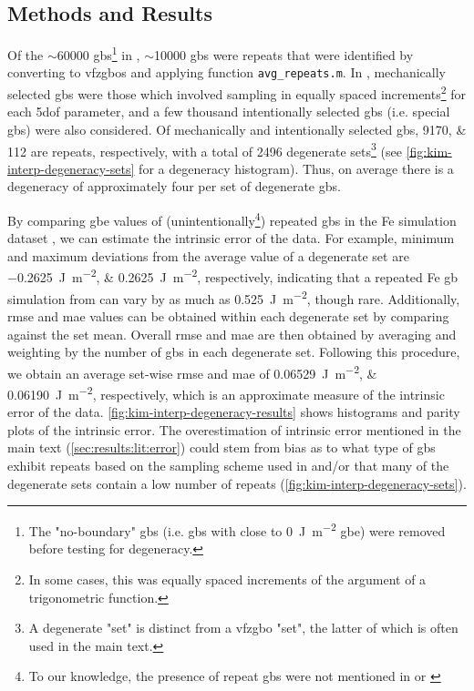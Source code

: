 \documentclass[preprint,12pt]{elsarticle}
\begin{document}
    \subsection{Methods and Results}
	\label{sec:supp:kim-interp:quality}
	Of the $\sim$\num{60000} \glspl{gb}\footnote{The "no-boundary" \glspl{gb} (i.e. \glspl{gb} with close to \SI{0}{\joule\per\square\meter} \gls{gbe}) were removed before testing for degeneracy.} in \cite{kimPhasefieldModeling3D2014}, $\sim$\num{10000} \glspl{gb} were repeats that were identified by converting to \glspl{vfzgbo} and applying \vfzorepo{} function \texttt{avg\_repeats.m}. In \cite{kimPhasefieldModeling3D2014}, mechanically selected \glspl{gb} were those which involved sampling in equally spaced increments\footnote{In some cases, this was equally spaced increments of the argument of a trigonometric function.} for each \gls{5dof} parameter, and a few thousand intentionally selected \glspl{gb} (i.e. special \glspl{gb}) were also considered. Of mechanically and intentionally selected \glspl{gb}, \numlist{9170;112} are repeats, respectively, with a total of \num{2496} degenerate sets\footnote{A degenerate "set" is distinct from a \gls{vfzgbo} "set", the latter of which is often used in the main text.} (see \cref{fig:kim-interp-degeneracy-sets} for a degeneracy histogram). Thus, on average there is a degeneracy of approximately four per set of degenerate \glspl{gb}.
	
	By comparing \gls{gbe} values of (unintentionally\footnote{To our knowledge, the presence of repeat \glspl{gb} were not mentioned in \cite{kimPhasefieldModeling3D2014} or \cite{kimIdentificationSchemeGrain2011}}) repeated \glspl{gb} in the Fe simulation dataset \cite{kimPhasefieldModeling3D2014}, we can estimate the intrinsic error of the \inpt{} data. For example, minimum and maximum deviations from the average value of a degenerate set are \SIlist{-0.2625;0.2625}{\joule\per\square\meter}, respectively, indicating that a repeated Fe \gls{gb} simulation from \cite{kimPhasefieldModeling3D2014} can vary by as much as \SI{0.525}{\joule\per\square\meter}, though rare. Additionally, \Gls{rmse} and \gls{mae} values can be obtained within each degenerate set by comparing against the set mean. Overall \gls{rmse} and \gls{mae} are then obtained by averaging and weighting by the number of \glspl{gb} in each degenerate set. Following this procedure, we obtain an average set-wise \gls{rmse} and \gls{mae} of \SIlist{0.06529;0.06190}{\joule\per\square\meter}, respectively, which is an approximate measure of the intrinsic error of the data. \cref{fig:kim-interp-degeneracy-results} shows histograms and parity plots of the intrinsic error. The overestimation of intrinsic error mentioned in the main text (\cref{sec:results:lit:error}) could stem from bias as to what type of \glspl{gb} exhibit repeats based on the sampling scheme used in \cite{kimPhasefieldModeling3D2014} and/or that many of the degenerate sets contain a low number of repeats (\cref{fig:kim-interp-degeneracy-sets}).
	
\end{document}
